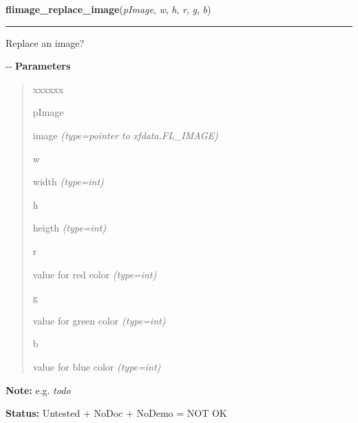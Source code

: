 \hspace{.8\funcindent}\begin{boxedminipage}{\funcwidth}

    \raggedright \textbf{flimage\_replace\_image}(\textit{pImage}, \textit{w}, \textit{h}, \textit{r}, \textit{g}, \textit{b})

    \vspace{-1.5ex}

    \rule{\textwidth}{0.5\fboxrule}
\setlength{\parskip}{2ex}

Replace an image?

-{}-
\setlength{\parskip}{1ex}
      \textbf{Parameters}
      \vspace{-1ex}

      \begin{quote}
        \begin{Ventry}{xxxxxx}

          \item[pImage]


image
            {\it (type=pointer to xfdata.FL\_IMAGE)}

          \item[w]


width
            {\it (type=int)}

          \item[h]


heigth
            {\it (type=int)}

          \item[r]


value for red color
            {\it (type=int)}

          \item[g]


value for green color
            {\it (type=int)}

          \item[b]


value for blue color
            {\it (type=int)}

        \end{Ventry}

      \end{quote}

\textbf{Note:} 
e.g. \emph{todo}


\textbf{Status:} 
Untested + NoDoc + NoDemo = NOT OK


    \end{boxedminipage}

    \label{xformslib:flflimage:flimage_swapbuffer}


